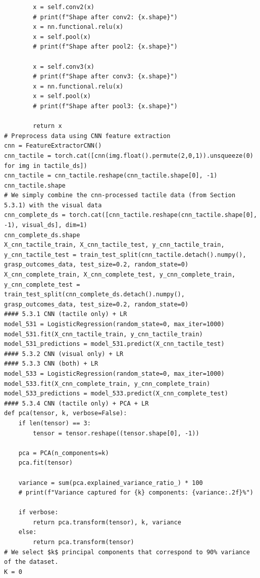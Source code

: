 \documentclass[11pt, a4paper]{report}
\begin{document}
\begin{lstlisting}
        x = self.conv2(x)
        # print(f"Shape after conv2: {x.shape}")
        x = nn.functional.relu(x)
        x = self.pool(x)
        # print(f"Shape after pool2: {x.shape}")
        
        x = self.conv3(x)
        # print(f"Shape after conv3: {x.shape}")
        x = nn.functional.relu(x)
        x = self.pool(x)
        # print(f"Shape after pool3: {x.shape}")

        return x
# Preprocess data using CNN feature extraction
cnn = FeatureExtractorCNN()
cnn_tactile = torch.cat([cnn(img.float().permute(2,0,1)).unsqueeze(0) for img in tactile_ds])
cnn_tactile = cnn_tactile.reshape(cnn_tactile.shape[0], -1)
cnn_tactile.shape
# We simply combine the cnn-processed tactile data (from Section 5.3.1) with the visual data
cnn_complete_ds = torch.cat([cnn_tactile.reshape(cnn_tactile.shape[0], -1), visual_ds], dim=1)
cnn_complete_ds.shape
X_cnn_tactile_train, X_cnn_tactile_test, y_cnn_tactile_train, y_cnn_tactile_test = train_test_split(cnn_tactile.detach().numpy(), grasp_outcomes_data, test_size=0.2, random_state=0)
X_cnn_complete_train, X_cnn_complete_test, y_cnn_complete_train, y_cnn_complete_test = train_test_split(cnn_complete_ds.detach().numpy(), grasp_outcomes_data, test_size=0.2, random_state=0)
#### 5.3.1 CNN (tactile only) + LR
model_531 = LogisticRegression(random_state=0, max_iter=1000)
model_531.fit(X_cnn_tactile_train, y_cnn_tactile_train)
model_531_predictions = model_531.predict(X_cnn_tactile_test)
#### 5.3.2 CNN (visual only) + LR
#### 5.3.3 CNN (both) + LR
model_533 = LogisticRegression(random_state=0, max_iter=1000)
model_533.fit(X_cnn_complete_train, y_cnn_complete_train)
model_533_predictions = model_533.predict(X_cnn_complete_test)
#### 5.3.4 CNN (tactile only) + PCA + LR
def pca(tensor, k, verbose=False):
    if len(tensor) == 3:
        tensor = tensor.reshape((tensor.shape[0], -1))
    
    pca = PCA(n_components=k)
    pca.fit(tensor)

    variance = sum(pca.explained_variance_ratio_) * 100
    # print(f"Variance captured for {k} components: {variance:.2f}%")

    if verbose:
        return pca.transform(tensor), k, variance
    else:
        return pca.transform(tensor)
# We select $k$ principal components that correspond to 90% variance of the dataset.
K = 0


\end{lstlisting}
\end{document}

